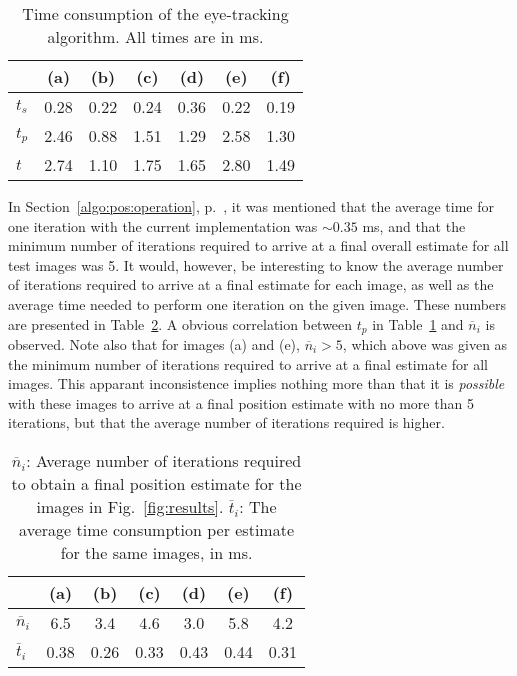 \begin{table}[tb]
  \begin{center}
    \begin{tabular}{|l||c|c|c|c|c|c|}                      \hline
              & (a)  & (b)  & (c)  & (d)  & (e)  & (f)  \\ \hline\hline
      $t_{s}$ & 0.28 & 0.22 & 0.24 & 0.36 & 0.22 & 0.19 \\ \hline
      $t_{p}$ & 2.46 & 0.88 & 1.51 & 1.29 & 2.58 & 1.30 \\ \hline
      $t$     & 2.74 & 1.10 & 1.75 & 1.65 & 2.80 & 1.49 \\ \hline
    \end{tabular}
  \end{center}
  \caption{\label{tab:time}Time consumption of the {\octopus}
    eye-tracking algorithm.  All times are in ms.}
\end{table}

In Section~\ref{algo:pos:operation}, p.~\pageref{pg:iterationtime}, it
was mentioned that the average time for one iteration with the current
implementation was $\sim 0.35$ ms, and that the minimum number of
iterations required to arrive at a final overall estimate for all test
images was 5.  It would, however, be interesting to know the average
number of iterations required to arrive at a final estimate for each
image, as well as the average time needed to perform one iteration on
the given image.  These numbers are presented in
Table~\ref{tab:iterations}.  A obvious correlation between $t_{p}$ in
Table~\ref{tab:time} and $\overline{n}_{i}$ is observed.  Note also
that for images (a) and (e), $\overline{n}_{i}>5$, which above was
given as the minimum number of iterations required to arrive at a
final estimate for all images.  This apparant inconsistence implies
nothing more than that it is {\em possible\/} with these images to
arrive at a final position estimate with no more than 5 iterations,
but that the average number of iterations required is higher.

\begin{table}[tb]
  \begin{center}
    \begin{tabular}{|l||c|c|c|c|c|c|}                           \hline
                         & (a) & (b) & (c) & (d) & (e) & (f) \\ \hline\hline
      $\overline{n}_{i}$ & 6.5  & 3.4  & 4.6  & 3.0  & 5.8  & 4.2  \\ \hline
      $\overline{t}_{i}$ & 0.38 & 0.26 & 0.33 & 0.43 & 0.44 & 0.31 \\ \hline
    \end{tabular}
  \end{center}
  \caption{\label{tab:iterations}$\overline{n}_{i}$: Average number of
    iterations required to obtain a final position estimate for the
    images in Fig.~\protect\ref{fig:results}.  $\overline{t}_{i}$: The
    average time consumption per estimate for the same images, in ms.}
\end{table}

